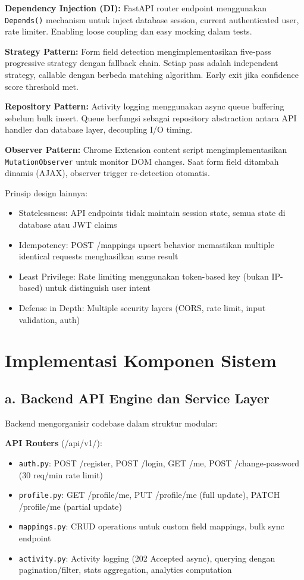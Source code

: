 \documentclass[12pt,a4paper]{article}
\begin{document}
\textbf{Dependency Injection (DI):} FastAPI router endpoint menggunakan \texttt{Depends()} mechanism untuk inject database session, current authenticated user, rate limiter. Enabling loose coupling dan easy mocking dalam tests.

\textbf{Strategy Pattern:} Form field detection mengimplementasikan five-pass progressive strategy dengan fallback chain. Setiap pass adalah independent strategy, callable dengan berbeda matching algorithm. Early exit jika confidence score threshold met.

\textbf{Repository Pattern:} Activity logging menggunakan async queue buffering sebelum bulk insert. Queue berfungsi sebagai repository abstraction antara API handler dan database layer, decoupling I/O timing.

\textbf{Observer Pattern:} Chrome Extension content script mengimplementasikan \texttt{MutationObserver} untuk monitor DOM changes. Saat form field ditambah dinamis (AJAX), observer trigger re-detection otomatis.

Prinsip design lainnya:
\begin{itemize}
  \item Statelessness: API endpoints tidak maintain session state, semua state di database atau JWT claims
  \item Idempotency: POST /mappings upsert behavior memastikan multiple identical requests menghasilkan same result
  \item Least Privilege: Rate limiting menggunakan token-based key (bukan IP-based) untuk distinguish user intent
  \item Defense in Depth: Multiple security layers (CORS, rate limit, input validation, auth)
\end{itemize}

\newpage

\section{Implementasi Komponen Sistem}

\subsection*{a. Backend API Engine dan Service Layer}

Backend mengorganisir codebase dalam struktur modular:

\textbf{API Routers} (/api/v1/):
\begin{itemize}
  \item \texttt{auth.py}: POST /register, POST /login, GET /me, POST /change-password (30 req/min rate limit)
  \item \texttt{profile.py}: GET /profile/me, PUT /profile/me (full update), PATCH /profile/me (partial update)
  \item \texttt{mappings.py}: CRUD operations untuk custom field mappings, bulk sync endpoint
  \item \texttt{activity.py}: Activity logging (202 Accepted async), querying dengan pagination/filter, stats aggregation, analytics computation
\end{itemize}
\end{document}
